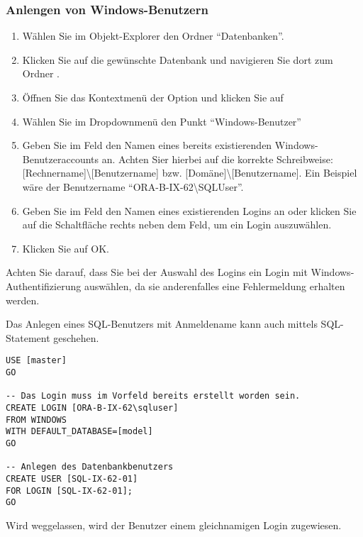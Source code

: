           \subsubsection{Anlengen von Windows-Benutzern}
            \begin{enumerate}
              \item Wählen Sie im Objekt-Explorer den Ordner
              \enquote{Datenbanken}.
              \item Klicken Sie auf die gewünschte Datenbank und navigieren
              Sie dort zum Ordner .
              \item Öffnen Sie das Kontextmenü der Option 
              und klicken Sie auf 
              \item Wählen Sie im Dropdownmenü  den Punkt
              \enquote{Windows-Benutzer}
              \item Geben Sie im Feld  den Namen eines
              bereits existierenden Windows-Benutzeraccounts an. Achten Sier
              hierbei auf die korrekte Schreibweise:
              [Rechnername]\textbackslash [Benutzername] bzw.
              [Domäne]\textbackslash [Benutzername]. Ein Beispiel wäre der
              Benutzername \enquote{ORA-B-IX-62\textbackslash SQLUser}.
              \item Geben Sie im Feld  den Namen eines
              existierenden Logins an oder klicken Sie auf die Schaltfläche
              rechts neben dem Feld, um ein Login auszuwählen.
              \item Klicken Sie auf OK.
            \end{enumerate}
            \begin{merke}
              Achten Sie darauf, dass Sie bei der Auswahl des Logins ein Login
              mit Windows-Authentifizierung auswählen, da sie anderenfalles eine
              Fehlermeldung erhalten werden.
            \end{merke}
            Das Anlegen eines SQL-Benutzers mit Anmeldename kann auch mittels
            SQL-Statement geschehen.
            \begin{lstlisting}[language=ms_sql, caption={Anlegen eines
            Windows-Benutzers}, label=admin19_13]
USE [master]
GO

-- Das Login muss im Vorfeld bereits erstellt worden sein.
CREATE LOGIN [ORA-B-IX-62\sqluser]
FROM WINDOWS 
WITH DEFAULT_DATABASE=[model]
GO

-- Anlegen des Datenbankbenutzers
CREATE USER [SQL-IX-62-01]
FOR LOGIN [SQL-IX-62-01];
GO
            \end{lstlisting}
            \begin{merke}
              Wird  weggelassen, wird der Benutzer einem
              gleichnamigen Login zugewiesen.
            \end{merke}
            \begin{literaturinternet}
              \item \cite{ms173463}
            \end{literaturinternet}
